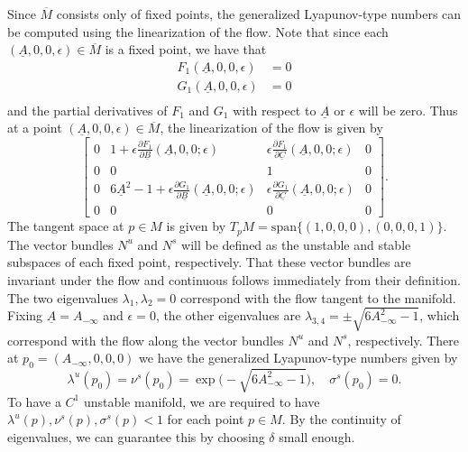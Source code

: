 Since \(\overline M\) consists only of fixed points, the generalized Lyapunov-type numbers can be computed using the linearization of the flow. Note that since each \((\underline A, 0, 0,\epsilon) \in \overline M\) is a fixed point, we have that
\begin{equation}
	\begin{aligned}
		F_1(\underline A, 0, 0, \epsilon) &= 0 \\
		G_1(\underline A, 0, 0, \epsilon) &= 0 \\
	\end{aligned}
\end{equation}
and the partial derivatives of \(F_1\) and \(G_1\) with respect to \(\underline A\) or \(\epsilon\) will be zero. Thus at a point \((\underline A, 0, 0, \epsilon) \in\overline M\), the linearization of the flow is given by
\begin{equation}\label{linearization-flow}
	\begin{bmatrix}
		0 & 1 + \epsilon \frac{\partial F_1}{\partial \underline B}(\underline A, 0, 0; \epsilon) & \epsilon \frac{\partial F_1}{\partial \underline C}(\underline A, 0, 0;\epsilon) & 0 \\
		0 & 0 & 1 & 0 \\
		0 & 6\underline A ^2 - 1 + \epsilon \frac{\partial G_1}{\partial \underline B}(\underline A, 0, 0; \epsilon) & \epsilon \frac{\partial G_1}{\partial \underline C}(\underline A, 0, 0; \epsilon) & 0 \\
		0 & 0 & 0 & 0
	\end{bmatrix}.
\end{equation}
The tangent space at \(p\in M\) is given by \(T_p M = \mathrm{span}\{(1,0,0,0), (0,0,0,1)\}\). The vector bundles \(N^u\) and \(N^s\) will be defined as the unstable and stable subspaces of each fixed point, respectively. That these vector bundles are invariant under the flow and continuous follows immediately from their definition. The two eigenvalues \(\lambda_1,\lambda_2=0\) correspond with the flow tangent to the manifold. Fixing \(\underline A = A_{-\infty}\) and \(\epsilon = 0\), the other eigenvalues are \(\lambda_{3,4} = \pm \sqrt{6A_{-\infty}^2-1}\), which correspond with the flow along the vector bundles \(N^u\) and \(N^s\), respectively. There at \(p_0 =(A_{-\infty}, 0, 0, 0)\)  we have the generalized Lyapunov-type numbers given by
\begin{equation}
	\lambda^u(p_0) = \nu^s(p_0) = \exp\big(-\sqrt{6A_{-\infty}^2-1}\big), \quad \sigma^s(p_0) = 0.
\end{equation}
To have a \(C^1\) unstable manifold, we are required to have \(\lambda^u(p), \nu^s(p), \sigma^s(p)  < 1\)  for each point \(p\in M\). By the continuity of eigenvalues, we can guarantee this by choosing \(\delta\) small enough.

